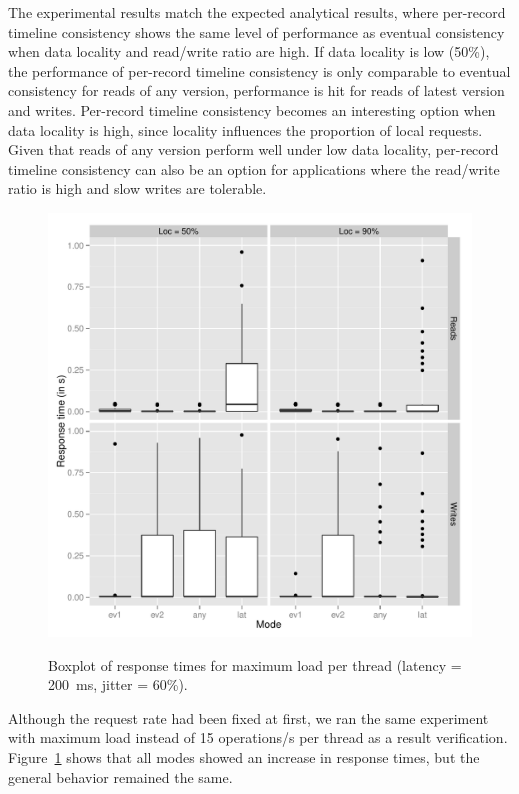 \documentclass[man,floatsintext,12pt]{apa6}
\begin{document}
The experimental results match the expected analytical results, where
per-record timeline consistency shows the same level of performance as eventual
consistency when data locality and read/write ratio are high.  If data locality
is low (50\%), the performance of per-record timeline consistency is only
comparable to eventual consistency for reads of any version, performance is hit
for reads of latest version and writes. Per-record timeline consistency
becomes an interesting option when data locality is high, since locality
influences the proportion of local requests. Given that reads of any version
perform well under low data locality, per-record timeline consistency can also
be an option for applications where the read/write ratio is high and slow
writes are tolerable.

\begin{figure}[h!]
\caption{Boxplot of response times for maximum load per thread (latency = 200~ms, jitter = 60\%).}
\includegraphics[width=1.0\textwidth]{boxplot200_max.png}
\label{fig:boxplot_response_times_max}
\end{figure}

Although the request rate had been fixed at first, we ran the same experiment
with maximum load instead of 15 operations/s per thread as a result
verification. Figure~\ref{fig:boxplot_response_times_max}
shows that all modes showed an increase in response times, but the general
behavior remained the same.
\end{document}

